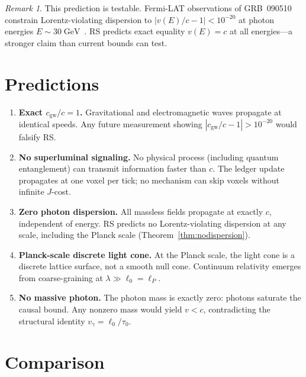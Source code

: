 \documentclass[12pt,a4paper]{article}
\theoremstyle{definition}
\theoremstyle{remark}
\newtheorem{remark}[theorem]{Remark}
\begin{document}
\begin{remark}
This prediction is testable.  Fermi-LAT observations of
GRB~090510 constrain Lorentz-violating dispersion to
$|v(E)/c - 1| < 10^{-20}$ at photon energies
$E \sim 30\;\mathrm{GeV}$~\cite{FermiLAT2009}.  RS predicts
exact equality $v(E) = c$ at all energies---a stronger claim
than current bounds can test.
\end{remark}

\section{Predictions}
\label{sec:predictions}

\begin{enumerate}
  \item \textbf{Exact $c_{\mathrm{gw}}/c = 1$.}  Gravitational and
  electromagnetic waves propagate at identical speeds.  Any future
  measurement showing $|c_{\mathrm{gw}}/c - 1| > 10^{-20}$ would
  falsify RS.

  \item \textbf{No superluminal signaling.}  No physical process
  (including quantum entanglement) can transmit information faster than
  $c$.  The ledger update propagates at one voxel per tick; no
  mechanism can skip voxels without infinite $J$-cost.

  \item \textbf{Zero photon dispersion.}  All massless fields
  propagate at exactly $c$, independent of energy.  RS predicts
  no Lorentz-violating dispersion at any scale, including the
  Planck scale (Theorem~\ref{thm:nodispersion}).

  \item \textbf{Planck-scale discrete light cone.}  At the Planck
  scale, the light cone is a discrete lattice surface, not a smooth
  null cone.  Continuum relativity emerges from coarse-graining at
  $\lambda \gg \ell_0 = \ell_P$.

  \item \textbf{No massive photon.}  The photon mass is exactly
  zero: photons saturate the causal bound.  Any nonzero mass
  would yield $v < c$, contradicting the structural identity
  $v_{\gamma} = \ell_0/\tau_0$.
\end{enumerate}

\section{Comparison}
\end{document}

